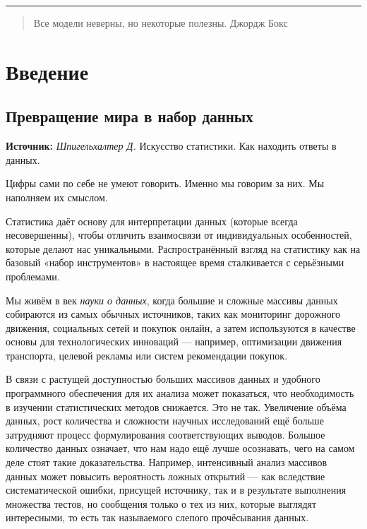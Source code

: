\documentclass[11pt,a4paper]{article}
\begin{document}
    \begin{center}\rule{0.5\linewidth}{0.5pt}\end{center}


\begin{quote}
  Все модели неверны, но некоторые полезны. Джордж Бокс
\end{quote}


    \hypertarget{ux432ux432ux435ux434ux435ux43dux438ux435}{%
\section{Введение}\label{ux432ux432ux435ux434ux435ux43dux438ux435}}

\hypertarget{ux43fux440ux435ux432ux440ux430ux449ux435ux43dux438ux435-ux43cux438ux440ux430-ux432-ux43dux430ux431ux43eux440-ux434ux430ux43dux43dux44bux445}{%
\subsection{Превращение мира в набор
данных}\label{ux43fux440ux435ux432ux440ux430ux449ux435ux43dux438ux435-ux43cux438ux440ux430-ux432-ux43dux430ux431ux43eux440-ux434ux430ux43dux43dux44bux445}}

\textbf{Источник:} \emph{Шпигельхалтер Д.} Искусство статистики. Как находить ответы в
  данных.

Цифры сами по себе не умеют говорить. Именно мы говорим за них. Мы
наполняем их смыслом.

Статистика даёт основу для интерпретации данных (которые всегда
несовершенны), чтобы отличить взаимосвязи от индивидуальных
особенностей, которые делают нас уникальными.
Распространённый взгляд на статистику как на базовый «набор
инструментов» в настоящее время сталкивается с серьёзными проблемами.

Мы живём в век \emph{науки о данных}, когда большие и
сложные массивы данных собираются из самых обычных источников, таких как
мониторинг дорожного движения, социальных сетей и покупок онлайн, а
затем используются в качестве основы для технологических инноваций ---
например, оптимизации движения транспорта, целевой рекламы или систем
рекомендации покупок.

В связи с растущей доступностью больших массивов данных и удобного
программного обеспечения для их анализа может показаться, что
необходимость в изучении статистических методов снижается. Это не так.
Увеличение объёма данных, рост количества и сложности научных
исследований ещё больше затрудняют процесс формулирования
соответствующих выводов. Большое количество данных означает, что нам
надо ещё лучше осознавать, чего на самом деле стоят такие
доказательства.
Например, интенсивный анализ массивов данных может повысить вероятность
ложных открытий --- как вследствие систематической ошибки, присущей
источнику, так и в результате выполнения множества тестов, но сообщения
только о тех из них, которые выглядят интересными, то есть так
называемого слепого прочёсывания данных.
\end{document}
